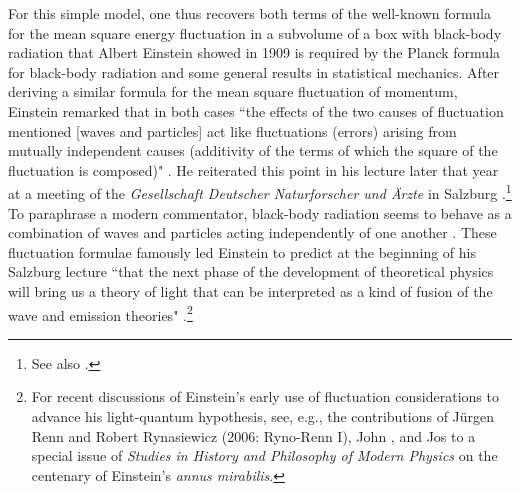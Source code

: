 \documentclass[12pt]{elsart}
\begin{document}
For this simple model, one thus recovers both terms of the well-known formula for the mean square energy fluctuation in a subvolume of a box with black-body radiation that Albert Einstein showed in 1909 is required by the Planck formula for black-body radiation and some general results in statistical mechanics. After deriving a similar formula for the mean square fluctuation of momentum, Einstein remarked that in both cases ``the effects of the two causes of fluctuation mentioned [waves and particles]  act like fluctuations (errors) arising from mutually independent causes (additivity of the terms of which the square of the fluctuation is composed)" \citep[p.\ 190]{Einstein 1909a}. He  reiterated this point in his lecture later that year at a meeting of the {\it Gesellschaft Deutscher Naturforscher und \"Arzte} in Salzburg \citep[p.\ 498]{Einstein 1909b}.\footnote{See also \citep[p.\ 346]{Einstein 1914}.} To paraphrase a modern commentator, black-body radiation seems to behave as a combination of waves and particles acting independently of one another \citep[p. 178]{Bach 1989}. These fluctuation formulae famously led Einstein to predict at the beginning of his Salzburg lecture ``that the next phase of the development of theoretical physics will bring us a theory of light that can be interpreted as a kind of fusion of the wave and emission theories" \citep[pp.\ 482--483]{Einstein 1909b}.\footnote{For recent discussions of Einstein's early use of fluctuation considerations to advance his light-quantum hypothesis, see, e.g., the contributions of  J\"urgen Renn and Robert Rynasiewicz (2006: Ryno-Renn I), John \citet{Norton 2006}, and Jos \citet{Uffink 2006} to a special issue of {\it Studies in History and Philosophy of Modern Physics} on the centenary of Einstein's {\it annus mirabilis}.}  
\end{document}
